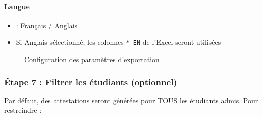 \begin{enumerate}[leftmargin=*]
    \paragraph{Langue}
    \begin{itemize}
        \item {} : Français / Anglais
        \item Si Anglais sélectionné, les colonnes \texttt{*\_EN} de l'Excel seront utilisées
    \end{itemize}
\end{enumerate}

\begin{figure}[h]
    \centering
    \caption{Configuration des paramètres d'exportation}
\end{figure}

\subsubsection{Étape 7 : Filtrer les étudiants (optionnel)}

Par défaut, des attestations seront générées pour TOUS les étudiants admis. Pour restreindre :

